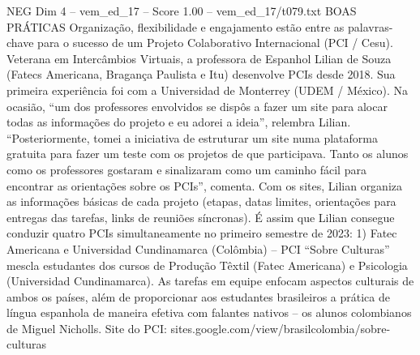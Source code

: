 \begin{textsample}{NEG Dim 4 – vem\_ed\_17 – Score 1.00 – vem\_ed\_17/t079.txt}  \label{ex:f4_neg_079}
BOAS PRÁTICAS Organização, flexibilidade e engajamento estão entre as palavras-chave para o sucesso de um Projeto Colaborativo Internacional (PCI / Cesu).
Veterana em Intercâmbios Virtuais, a professora de Espanhol Lilian de Souza (Fatecs Americana, Bragança Paulista e Itu) desenvolve PCIs desde 2018.
Sua primeira experiência foi com a Universidad de Monterrey (UDEM / México).
Na ocasião, “um dos professores envolvidos se dispôs a fazer um site para alocar todas as informações do projeto e eu adorei a ideia”, relembra Lilian. “Posteriormente, tomei a iniciativa de estruturar um site numa plataforma gratuita para fazer um teste com os projetos de que participava.
Tanto os alunos como os professores gostaram e sinalizaram como um caminho fácil para encontrar as orientações sobre os PCIs”, comenta.
Com os sites, Lilian organiza as informações básicas de cada projeto (etapas, datas limites, orientações para entregas das tarefas, links de reuniões síncronas).
É assim que Lilian consegue conduzir quatro PCIs simultaneamente no primeiro semestre de 2023: 1) Fatec Americana e Universidad Cundinamarca (Colômbia) – PCI “Sobre Culturas” mescla estudantes dos cursos de Produção Têxtil (Fatec Americana) e Psicologia (Universidad Cundinamarca).
As tarefas em equipe enfocam aspectos culturais de ambos os países, além de proporcionar aos estudantes brasileiros a prática de língua espanhola de maneira efetiva com falantes nativos – os alunos colombianos de Miguel Nicholls.
Site do PCI: sites.google.com/view/brasilcolombia/sobre-culturas

\end{textsample}
